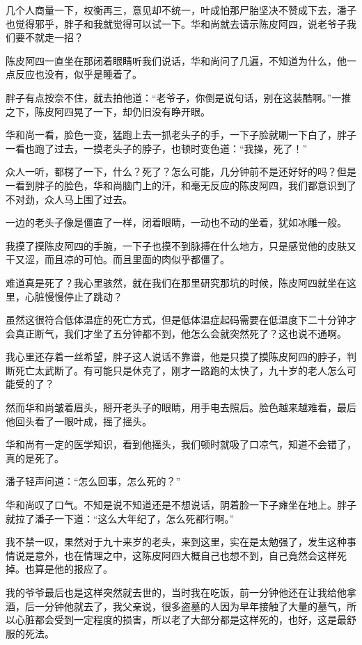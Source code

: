 几个人商量一下，权衡再三，意见却不统一，叶成怕那尸胎坚决不赞成下去，潘子也觉得邪乎，胖子和我就觉得可以试一下。华和尚就去请示陈皮阿四，说老爷子我们要不就走一招？

陈皮阿四一直坐在那闭着眼睛听我们说话，华和尚问了几遍，不知道为什么，他一点反应也没有，似乎是睡着了。

胖子有点按奈不住，就去拍他道：“老爷子，你倒是说句话，别在这装酷啊。”一推之下，陈皮阿四晃了一下，却仍旧没有睁开眼。

华和尚一看，脸色一变，猛跑上去一抓老头子的手，一下子脸就唰一下白了，胖子一看也跑了过去，一摸老头子的脖子，也顿时变色道：“我操，死了！”

众人一听，都楞了一下，什么？死了？怎么可能，几分钟前不是还好好的吗？但是一看到胖子的脸色，华和尚脑门上的汗，和毫无反应的陈皮阿四，我们都意识到了不对劲，众人马上围了过去。

一边的老头子像是僵直了一样，闭着眼睛，一动也不动的坐着，犹如冰雕一般。

我摸了摸陈皮阿四的手腕，一下子也摸不到脉搏在什么地方，只是感觉他的皮肤又干又涩，而且凉的可怕。而且里面的肉似乎都僵了。

难道真是死了？我心里骇然，就在我们在那里研究那坑的时候，陈皮阿四就坐在这里，心脏慢慢停止了跳动？

虽然这很符合低体温症的死亡方式，但是低体温症起码需要在低温度下二十分钟才会真正断气，我们才坐了五分钟都不到，他怎么会就突然死了？这也说不通啊。

我心里还存着一丝希望，胖子这人说话不靠谱，他是只摸了摸陈皮阿四的脖子，判断死亡太武断了。有可能只是休克了，刚才一路跑的太快了，九十岁的老人怎么可能受的了？

然而华和尚皱着眉头，掰开老头子的眼睛，用手电去照后。脸色越来越难看，最后他回头看了一眼叶成，摇了摇头。

华和尚有一定的医学知识，看到他摇头，我们顿时就吸了口凉气，知道不会错了，真的是死了。

潘子轻声问道：“怎么回事，怎么死的？”

华和尚叹了口气。不知是说不知道还是不想说话，阴着脸一下子瘫坐在地上。胖子就拉了潘子一下道：“这么大年纪了，怎么死都行啊。”

我不禁一叹，果然对于九十来岁的老头，来到这里，实在是太勉强了，发生这种事情说是意外，也在情理之中，这陈皮阿四大概自己也想不到，自己竟然会这样死掉。也算是他的报应了。

我的爷爷最后也是这样突然就去世的，当时我在吃饭，前一分钟他还在让我给他拿酒，后一分钟他就去了，我父亲说，很多盗墓的人因为早年接触了大量的墓气，所以心脏都会受到一定程度的损害，所以老了大部分都是这样死的，也好，这是最舒服的死法。

